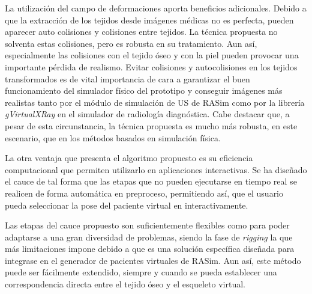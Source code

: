 La utilización del campo de deformaciones aporta beneficios adicionales. Debido a que la extracción de los tejidos desde imágenes médicas no es perfecta, pueden aparecer auto colisiones y colisiones entre tejidos. La técnica propuesta no solventa estas colisiones, pero es robusta en su tratamiento. Aun así, especialmente las colisiones con el tejido óseo y con la piel pueden provocar una importante pérdida de realismo. Evitar colisiones y autocolisiones en los tejidos transformados es de vital importancia de cara a garantizar el buen funcionamiento del simulador físico del prototipo y conseguir imágenes más realistas tanto por el módulo de simulación de \ac{US} de \ac{RASim} como por la librería \emph{gVirtualXRay} en el simulador de radiología diagnóstica. %
Cabe destacar que, a pesar de esta circunstancia, la técnica propuesta es mucho más robusta, en este escenario, que en los métodos basados en simulación física. %





La otra ventaja que presenta el algoritmo propuesto es su eficiencia computacional que permiten utilizarlo en aplicaciones interactivas. Se ha diseñado el cauce de tal forma que las etapas que no pueden ejecutarse en tiempo real se realicen de forma automática en preproceso, permitiendo así, que el usuario pueda seleccionar la pose del paciente virtual en interactivamente.

Las etapas del cauce propuesto son suficientemente flexibles como para poder adaptarse a una gran diversidad de problemas, siendo la fase de \emph{rigging} la que más limitaciones impone debido a que es una solución específica diseñada para integrase en el generador de pacientes virtuales de \ac{RASim}. Aun así, este método puede ser fácilmente extendido, siempre y cuando se pueda establecer una correspondencia directa entre el tejido óseo y el esqueleto virtual.

